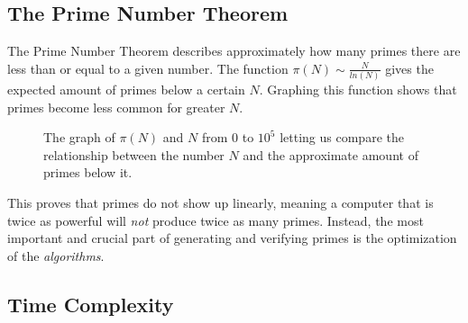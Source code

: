 \documentclass[main.tex]{subfiles}
\begin{document}
\subsection{The Prime Number Theorem}
The Prime Number Theorem \cite{theorem:prime_num} describes approximately how
many primes there are less than or equal to a given number. The function $\pi(N)
\sim \frac{N}{ln(N)}$ gives the expected amount of primes below a certain $N$.
Graphing this function shows that primes become less common for greater $N$.

\begin{figure}[ht]
  \begin{center}
  \end{center}
  \caption{The graph of $\pi(N)$ and $N$ from $0$ to $10^{5}$ letting us compare
    the relationship between the number $N$ and the approximate amount of primes
    below it.}
\end{figure}

This proves that primes do not show up linearly, meaning a computer that is
twice as powerful will \textit{not} produce twice as many primes. Instead, the
most important and crucial part of generating and verifying primes is the
optimization of the \textit{algorithms}.

\subsection{Time Complexity}
\end{document}
